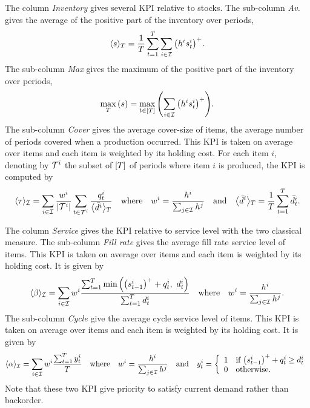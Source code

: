 The column \emph{Inventory} gives several KPI relative to stocks.
The sub-column \emph{Av.} gives the average of the positive part of the inventory over periods, \ie
\begin{equation}
  \left<\inventory\right>_{\horizon} = \frac{1}{\horizon}\sum_{t=1}^{\horizon}\sum_{i\in\REF} \bracket{\holding^i\inventory_t^i}^+.
\end{equation}
The sub-column \emph{Max} gives the maximum of the positive part of the inventory over periods, \ie
\begin{equation}
  \max_{\horizon}\bracket{\inventory} = \max_{t\in\range{\horizon}}\bracket{\sum_{i\in\REF} \bracket{\holding^i\inventory_t^i}^+}.
\end{equation}
The sub-column \emph{Cover} gives the average cover-size of items, \ie the average number of periods covered when a production occurred.
This KPI is taken on average over items and each item is weighted by its holding cost.
For each item $i$, denoting by $\mathcal{T}^i$ the subset of $\range{\horizon}$ of periods where item $i$ is produced, the KPI is computed by
\begin{equation}\label{eq:pdp:numerical-experiments:KPI:cover}
  \left<\cover\right>_{\REF}
  = \sum_{i\in\REF} \frac{w^i}{\card{\cT^i}}\sum_{t\in\cT^i} \frac{\quantity_t^i}{\left<\bar{\demand}^i\right>_{\horizon}}
  \quad\mbox{where}\quad
  w^i=\frac{\holding^i}{\sum_{j\in\REF}\holding^j}
  \quad\mbox{and}\quad
  \left<\bar{\demand}^i\right>_{\horizon}=\frac{1}{\horizon}\sum_{t=1}^{\horizon} \bar{\demand_t^i}.
\end{equation}


The column \emph{Service} gives the KPI relative to service level with the two classical measure.
The sub-column \emph{Fill rate} gives the average fill rate service level of items.
This KPI is taken on average over items and each item is weighted by its holding cost.
It is given by
\begin{equation}\label{eq:pdp:numerical-experiments:KPI:fill-rate-service-level}
  \left<\beta\right>_{\REF} = \sum_{i\in\REF} w^i \frac{\sum_{t=1}^{\horizon}\min\bracket{\bracket{\inventory_{t-1}^i}^++\quantity_t^i,\ \demand_t^i}}{\sum_{t=1}^{\horizon}\demand_t^i}
  \quad\mbox{where}\quad
  w^i=\frac{\holding^i}{\sum_{j\in\REF}\holding^j}.
\end{equation}
The sub-column \emph{Cycle} give the average cycle service level of items.
This KPI is taken on average over items and each item is weighted by its holding cost.
It is given by
\begin{equation}\label{eq:pdp:numerical-experiments:KPI:cycle-service-level}
  \left<\alpha\right>_{\REF} = \sum_{i\in\REF} w^i\frac{\sum_{t=1}^{\horizon} y_t^i}{\horizon}
  \quad\mbox{where}\quad
  w^i=\frac{\holding^i}{\sum_{j\in\REF}\holding^j}
  \quad\mbox{and}\quad
  y_t^i =
  \left\{
  \begin{array}{ll}
  1 & \mbox{if}\ \bracket{\inventory_{t-1}^i}^++\quantity_t^i\ge\demand_t^i \\
  0 & \mbox{otherwise}.
  \end{array}
  \right.
\end{equation}
Note that these two KPI give priority to satisfy current demand rather than backorder.


